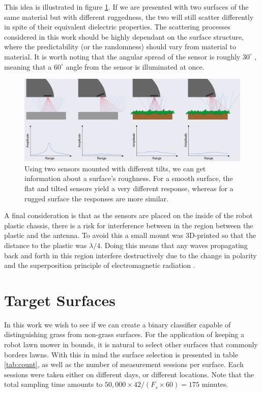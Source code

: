 This idea is illustrated in figure \ref{fig:reflections}. If we are presented with two surfaces of the same material but with different ruggedness, the two will still scatter differently in spite of their equivalent dielectric properties. The scattering processes considered in this work should be highly dependant on the surface structure, where the predictability (or the randomness) should vary from material to material. It is worth noting that the angular spread of the sensor is roughly $30^\circ$ \citep{acconeer_datasheet_a111}, meaning that a $60^\circ$ angle from the sensor is illuminated at once. 


\begin{figure}[h]
	\centering
	\includegraphics[scale=0.9]{figs_temp/reflections.jpg}
	\caption{Using two sensors mounted with different tilts, we can get information about a surface's roughness. For a smooth surface, the flat and tilted sensors yield a very different response, whereas for a rugged surface the responses are more similar.}
	\label{fig:reflections}
\end{figure}

A final consideration is that as the sensors are placed on the inside of the robot plastic chassis, there is a risk for interference between in the region between the plastic and the antenna. To avoid this a small mount was 3D-printed so that the distance to the plastic was $\lambda/4$. Doing this means that any waves propagating back and forth in this region interfere destructively due to the change in polarity and the superposition principle of electromagnetic radiation \citep{griffiths_2018}.

\section{Target Surfaces}

In this work we wish to see if we can create a binary classifier capable of distinguishing grass from non-grass surfaces. For the application of keeping a robot lawn mower in bounds, it is natural to select other surfaces that commonly borders lawns. With this in mind the surface selection is presented in table \ref{tab:count}, as well as the number of measurement sessions per surface. Each sessions were taken either on different days, or different locations. Note that the total sampling time amounts to $50,000\times42/(F_s\times60)=175$ minutes.

